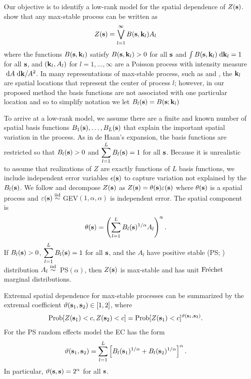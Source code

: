 Our objective is to identify a low-rank model for the spatial dependence of $Z(\mathbf{s})$.
 show that any max-stable process can be written as
\begin{align} \label{ebeq:spectral}
  Z(\mathbf{s}) = \bigvee_{l = 1}^{\infty} B(\mathbf{s}, \mathbf{k}_l)A_{l}
\end{align}
where the functions $B(\mathbf{s}, \mathbf{k}_l)$ satisfy $B(\mathbf{s}, \mathbf{k}_l) > 0$ for all $\mathbf{s}$ and $\int B(\mathbf{s}, \mathbf{k}_l) \; \text{d} \mathbf{k}_l = 1$ for all $\mathbf{s}$, and $(\mathbf{k}_l, A_l)$ for $l=1,\ldots,\infty$ are a Poisson process with intensity measure $\; \text{d} A \; \text{d} \mathbf{k}/A^2$.
In many representations of max-stable process, such as \citet{Smith1990} and \citet{Reich2012}, the $\mathbf{k}_l$ are spatial locations that represent the center of process $l$; however, in our proposed method the basis functions are not associated with one particular location and so to simplify notation we let $B_l(\mathbf{s}) = B(\mathbf{s}; \mathbf{k}_l)$

To arrive at a low-rank model, we assume there are a finite and known number of spatial basis functions $B_1(\mathbf{s}), \ldots, B_L(\mathbf{s})$ that explain the important spatial variation in the process.
As in de Haan's expansion, the basis functions are restricted so that $B_l(\mathbf{s}) > 0$ and $\displaystyle \sum_{l = 1}^L B_l(\mathbf{s}) = 1$ for all $\mathbf{s}$.
Because it is unrealistic to assume that realizations of $Z$ are exactly functions of $L$ basis functions, we include independent error variables $\epsilon(\mathbf{s})$ to capture variation not explained by the $B_l(\mathbf{s})$.
We follow \citet{Reich2012} and decompose $Z(\mathbf{s})$ as $Z(\mathbf{s})=\theta(\mathbf{s})\varepsilon(\mathbf{s})$ where $\theta(\mathbf{s})$ is a spatial process and $\varepsilon(\mathbf{s})\stackrel{\mathrm{iid}}{\sim}$ GEV$(1,\alpha,\alpha)$ is independent error.
The spatial component is
\begin{align} \label{ebeq:theta}
  \theta(\mathbf{s}) = \left(\sum_{l=1}^LB_{l}(\mathbf{s})^{1/\alpha}A_{l}\right)^{\alpha}.
\end{align}
If $B_{l}(\mathbf{s})>0$, $\displaystyle \sum_{l=1}^LB_{l}(\mathbf{s})=1$ for all $\mathbf{s}$, and the $A_{l}$ have positive stable (PS; ) distribution \mbox{$A_{l}\stackrel{\mathrm{iid}}{\sim}$ PS$(\alpha)$}, then $Z(\mathbf{s})$ is max-stable and has unit $\mbox{Fr$\acute{\mbox{e}}$chet }$ marginal distributions.

Extremal spatial dependence for max-stable processes can be summarized by the extremal coefficient \citep[EC]{Schlather2003} $\vartheta(\mathbf{s}_1, \mathbf{s}_2)\in[1,2]$, where
\begin{align} \label{ebeq:ECdev}
  \mbox{Prob}[Z(\mathbf{s}_1)<c, Z(\mathbf{s}_2)<c] = \mbox{Prob}[Z(\mathbf{s}_1)<c]^{\vartheta(\mathbf{s}_1,\mathbf{s}_2)}.
\end{align}
For the PS random effects model the EC has the form
\begin{align} \label{ebeq:EC}
   \vartheta(\mathbf{s}_1,\mathbf{s}_2) = \sum_{l=1}^L \left[B_{l}(\mathbf{s}_1)^{1/\alpha}+B_{l}(\mathbf{s}_2)^{1/\alpha}\right]^\alpha.
\end{align}
In particular, $\vartheta(\mathbf{s},\mathbf{s}) = 2^{\alpha}$ for all $\mathbf{s}$.

